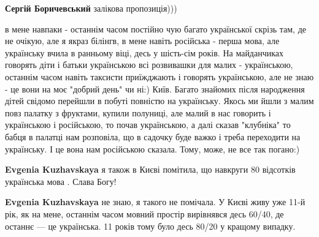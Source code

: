 \begin{itemize}
\begin{itemize}
\textbf{Сергій Боричевський} залікова пропозиція)))

\end{itemize}

 

в мене навпаки - останнім часом постійно чую багато української скрізь там, де
не очікую, але я якраз білінгв, в мене навіть російська - перша мова, але
українську вчила в ранньому віці, десь у шість-сім років. На майданчиках
говорять діти і батьки українською всі розвивашки для малих - українською,
останнім часом навіть таксисти приїжджають і говорять українською, але не знаю
- це вони на моє "добрий день" чи ні:) Київ. Багато знайомих після народження
дітей свідомо перейшли в побуті повністю на українську. Якось ми йшли з малим
повз палатку з фруктами, купили полуниці, але малий в нас говорить і
українською і російською, то почав українською, а далі сказав "клубніка" то
бабця в палатці нам розповіла, що в садочку буде важко і треба переходити на
українську. І це вона нам російською сказала. Тому, може, не все так погано:)

\begin{itemize}
 
\textbf{Evgenia Kuzhavskaya} я також в Києві помітила, що навкруги 80 відсотків українська мова . Слава Богу!

 
\textbf{Evgenia Kuzhavskaya} не знаю, я такого не помічала. У Києві живу уже
11-й рік, як на мене, останнім часом мовний простір вирівнявся десь 60/40, де
останнє — це українська. 11 років тому було десь 80/20 у кращому випадку.

 

\end{itemize}
\end{itemize}
